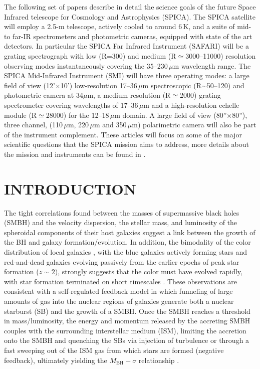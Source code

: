 \documentclass{pasa}%
\begin{document}
\vspace{0.5cm}
\noindent
The following set of papers describe in detail the science goals of the future
Space Infrared telescope for Cosmology and Astrophysics (SPICA). The SPICA
satellite will employ a 2.5-m telescope, actively cooled to around 6\,K, and a
suite of mid- to far-IR spectrometers and photometric cameras, equipped with
state of the art detectors. In particular the SPICA Far Infrared Instrument
(SAFARI) will be a grating spectrograph with low (R=300) and medium
(R$\simeq$3000--11000) resolution observing modes instantaneously covering the
35--230\,$\mu$m wavelength range. The SPICA Mid-Infrared Instrument (SMI) will
have three operating modes:  a large field of view (12'$\times$10')
low-resolution 17--36\,$\mu$m spectroscopic (R$\sim$50--120) and photometric
camera at 34$\mu$m, a medium resolution (R$\simeq$2000)  grating spectrometer
covering wavelengths of 17--36\,$\mu$m and a high-resolution echelle module
(R$\simeq$28000) for the 12--18\,$\mu$m domain.  A  large field of view
(80''$\times$80''), three channel, (110\,$\mu$m, 220\,$\mu$m and 350\,$\mu$m)
polarimetric camera will also be part of the instrument complement. These
articles will focus on some of the major scientific questions that the SPICA
mission aims to address, more details about the mission and instruments can be
found in \citet{roe17}. 





\section{INTRODUCTION }
\label{sec:intro}

The tight 
correlations found between the masses of supermassive black holes (SMBH) and
the velocity dispersion, the stellar mass, and luminosity of the spheroidal
components of their host galaxies 
\citep[e.g.][]{mag98,fer00,tre02} suggest a link between
the growth of the BH and galaxy formation/evolution. 
In addition, the bimodality of the color distribution of
local galaxies \citep[e.g.][]{str01,bal04}, with the blue
galaxies actively forming stars and red-and-dead galaxies evolving passively
from the earlier epochs of peak star formation ($z\sim2$), strongly suggests
that the color must have evolved rapidly, 
with star formation terminated on short timescales 
\citep[e.g.][]{hop06a,sch14}. These observations are consistent with a
self-regulated feedback model in which funneling of 
large amounts of gas into the nuclear regions of galaxies generate both
a nuclear starburst (SB) and the growth of a SMBH. Once the SMBH reaches a
threshold in mass/luminosity, the energy and momentum released by the
accreting SMBH couples with the surrounding interstellar medium (ISM),
limiting the accretion onto the SMBH and quenching the SBs via injection of
turbulence or through a fast
sweeping out of the ISM gas from which stars are formed (negative feedback), 
ultimately yielding the $M_{\mathrm{BH}}-\sigma$ relationship 
\citep{sil98,mat05,spr05,mur05,hop06b}.
\end{document}
